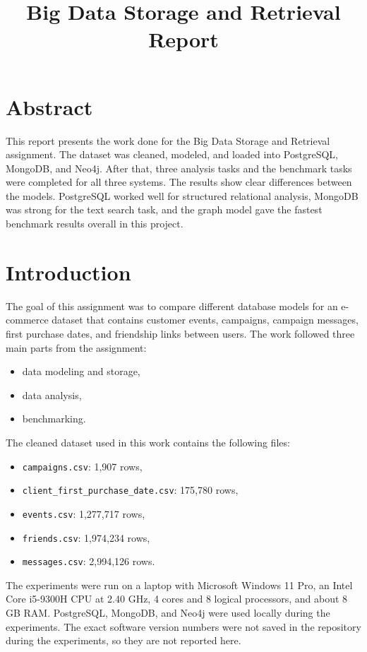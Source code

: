 \documentclass[11pt,a4paper]{article}
\title{Big Data Storage and Retrieval Report}
\author{}
\date{}
\begin{document}
\maketitle

\section{Abstract}
This report presents the work done for the Big Data Storage and Retrieval assignment. The dataset was cleaned, modeled, and loaded into PostgreSQL, MongoDB, and Neo4j. After that, three analysis tasks and the benchmark tasks were completed for all three systems. The results show clear differences between the models. PostgreSQL worked well for structured relational analysis, MongoDB was strong for the text search task, and the graph model gave the fastest benchmark results overall in this project.

\section{Introduction}
The goal of this assignment was to compare different database models for an e-commerce dataset that contains customer events, campaigns, campaign messages, first purchase dates, and friendship links between users. The work followed three main parts from the assignment:
\begin{itemize}
    \item data modeling and storage,
    \item data analysis,
    \item benchmarking.
\end{itemize}

The cleaned dataset used in this work contains the following files:
\begin{itemize}
    \item \texttt{campaigns.csv}: 1{,}907 rows,
    \item \texttt{client\_first\_purchase\_date.csv}: 175{,}780 rows,
    \item \texttt{events.csv}: 1{,}277{,}717 rows,
    \item \texttt{friends.csv}: 1{,}974{,}234 rows,
    \item \texttt{messages.csv}: 2{,}994{,}126 rows.
\end{itemize}

The experiments were run on a laptop with Microsoft Windows 11 Pro, an Intel Core i5-9300H CPU at 2.40 GHz, 4 cores and 8 logical processors, and about 8 GB RAM. PostgreSQL, MongoDB, and Neo4j were used locally during the experiments. The exact software version numbers were not saved in the repository during the experiments, so they are not reported here.
\end{document}
